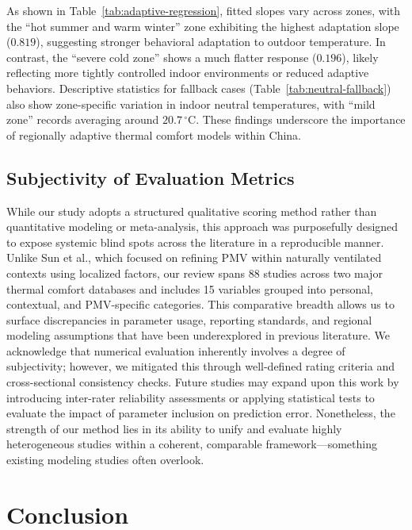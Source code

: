 \documentclass[final,3p,times,12pt]{elsarticle}
\begin{document}
As shown in Table~\ref{tab:adaptive-regression}, fitted slopes vary across zones, with the ``hot summer and warm winter'' zone exhibiting the highest adaptation slope ($0.819$), suggesting stronger behavioral adaptation to outdoor temperature. In contrast, the ``severe cold zone'' shows a much flatter response ($0.196$), likely reflecting more tightly controlled indoor environments or reduced adaptive behaviors. Descriptive statistics for fallback cases (Table~\ref{tab:neutral-fallback}) also show zone-specific variation in indoor neutral temperatures, with ``mild zone'' records averaging around $20.7\,^\circ$C. These findings underscore the importance of regionally adaptive thermal comfort models within China.

\subsection{Subjectivity of Evaluation Metrics}

While our study adopts a structured qualitative scoring method rather than quantitative modeling or meta-analysis, this approach was purposefully designed to expose systemic blind spots across the literature in a reproducible manner. Unlike Sun et al.\cite{Sun2019ImprovedPMV}, which focused on refining PMV within naturally ventilated contexts using localized factors, our review spans 88 studies across two major thermal comfort databases and includes 15 variables grouped into personal, contextual, and PMV-specific categories. This comparative breadth allows us to surface discrepancies in parameter usage, reporting standards, and regional modeling assumptions that have been underexplored in previous literature. We acknowledge that numerical evaluation inherently involves a degree of subjectivity; however, we mitigated this through well-defined rating criteria and cross-sectional consistency checks. Future studies may expand upon this work by introducing inter-rater reliability assessments or applying statistical tests to evaluate the impact of parameter inclusion on prediction error. Nonetheless, the strength of our method lies in its ability to unify and evaluate highly heterogeneous studies within a coherent, comparable framework—something existing modeling studies often overlook.

\section{Conclusion}
\label{sec1}
\end{document}
